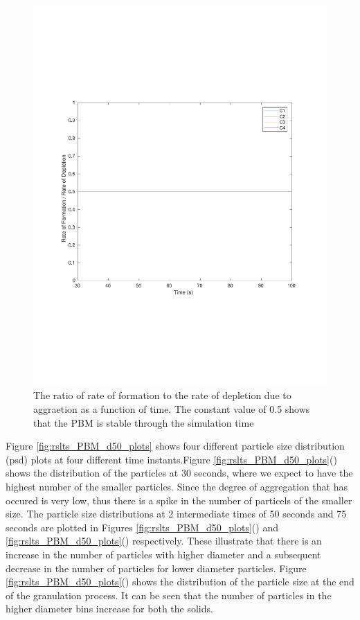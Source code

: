 \documentclass[preprint,11pt,authoryear]{elsarticle}
\begin{document}
\begin{figure}[H]
\begin{center}
\includegraphics[scale=0.5]{rslts_PBM_2mm_validation.pdf}
\caption{The ratio of rate of formation to the rate of depletion due to aggraetion as a function of time. 
    The constant value of 0.5 shows that the PBM is stable through the simulation time}
\label{fig:rslts_PBM_ratio_plot_2mm}
\end{center}
\end{figure}
Figure \ref{fig:rslts_PBM_d50_plots} shows four different particle size distribution (psd) plots at four 
different time instants.Figure \ref{fig:rslts_PBM_d50_plots}() shows the distribution of 
the particles at 30 seconds, where we expect to have the highest number of the smaller particles. 
Since the degree of aggregation that has occured is very low, thus there is a spike in the number of 
particels of the smaller size. The particle size distributions at 2 intermediate times of 50 seconds and 
75 seconds are plotted in Figures \ref{fig:rslts_PBM_d50_plots}() and 
\ref{fig:rslts_PBM_d50_plots}() respectively. These illustrate that there is an increase in 
the number of particles with higher diameter and a subsequent decrease in the number of particles for 
lower diameter particles. Figure \ref{fig:rslts_PBM_d50_plots}() shows the distribution 
of the particle size at the end of the granulation process. It can be seen that the number of particles in 
the higher diameter bins increase for both the solids. 
\end{document}
